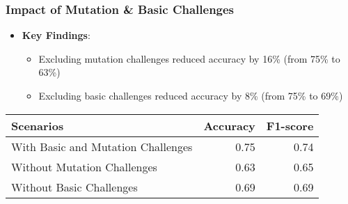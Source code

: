 \begin{frame}
  \end{frame}

\begin{frame}
  \frametitle{Impact of Mutation \& Basic Challenges}

    \begin{itemize}
      \item \textbf{Key Findings}:
      \begin{itemize}
        \item Excluding mutation challenges reduced accuracy by 16\% (from 75\% to 63\%)
        \item Excluding basic challenges reduced accuracy by 8\% (from 75\% to 69\%)
      \end{itemize}
    \end{itemize}

    \begin{center}
      \small
      \begin{tabular}{lrr}
      \toprule
      \textbf{Scenarios} & \textbf{Accuracy} & \textbf{F1-score} \\ \midrule
      With Basic and Mutation Challenges & 0.75 & 0.74 \\ 
      Without Mutation Challenges & 0.63 & 0.65 \\ 
      Without Basic Challenges & 0.69 & 0.69 \\ 
      \bottomrule
      \end{tabular}
      \label{tab:mutation_impact}
    \end{center}
\end{frame}


